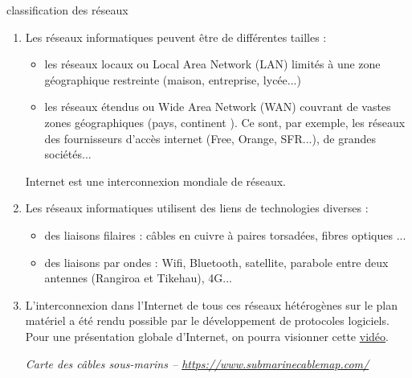 \documentclass[a4paper,dvipsnames]{article}
\begin{document}
\medskip

\begin{definition}[breakable]{classification des réseaux}{}
 \begin{enumerate}
   \item Les réseaux informatiques peuvent être de différentes tailles :
     \begin{itemize}
       \item les réseaux locaux ou {\color{red}Local Area Network (LAN)} limités à une zone géographique restreinte (maison, entreprise, lycée...)
     \item les réseaux étendus ou {\color{red}Wide Area Network (WAN)} couvrant de vastes zones géographiques (pays, continent ). Ce sont, par exemple, les réseaux des fournisseurs d'accès internet (Free, Orange, SFR...), de grandes sociétés...
     \end{itemize}
     Internet est une interconnexion mondiale de réseaux.
   \item Les réseaux informatiques utilisent des liens de technologies diverses :
     \begin{itemize}
       \item des {\color{red}liaisons filaires} : câbles en cuivre à paires torsadées, fibres optiques ...
       \item des liaisons {\color{red}par ondes} : Wifi, Bluetooth, satellite,
         parabole entre deux antennes (Rangiroa et Tikehau), 4G...
     \end{itemize}
   \item L'interconnexion dans l'Internet de tous ces réseaux hétérogènes sur le plan matériel a été rendu possible par le développement de protocoles logiciels. Pour une présentation globale d'Internet, on pourra visionner cette \href{https://www.youtube.com/watch?v=dCknqcjcItU}{vidéo}.

     \begin{center}

       \smallskip

       \scriptsize\textit{Carte des câbles sous-marins -- \url{https://www.submarinecablemap.com/}}
     \end{center}

 \end{enumerate}
\end{definition}
\end{document}
